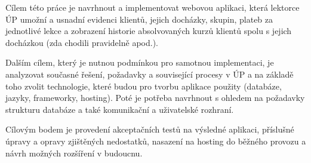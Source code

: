 Cílem této práce je navrhnout a implementovat webovou aplikaci, která lektorce ÚP umožní a usnadní evidenci klientů, jejich docházky, skupin, plateb za jednotlivé lekce a zobrazení historie absolvovaných kurzů klientů spolu s jejich docházkou (zda chodili pravidelně apod.).

Dalším cílem, který je nutnou podmínkou pro samotnou implementaci, je analyzovat současné řešení, požadavky a související procesy v ÚP a na základě toho zvolit technologie, které budou pro tvorbu aplikace použity (databáze, jazyky, frameworky, hosting). Poté je potřeba navrhnout s ohledem na požadavky strukturu databáze a také komunikační a uživatelské rozhraní.

Cílovým bodem je provedení akceptačních testů na výsledné aplikaci, příslušné úpravy a opravy zjištěných nedostatků, nasazení na hosting do běžného provozu a návrh možných rozšíření v budoucnu.